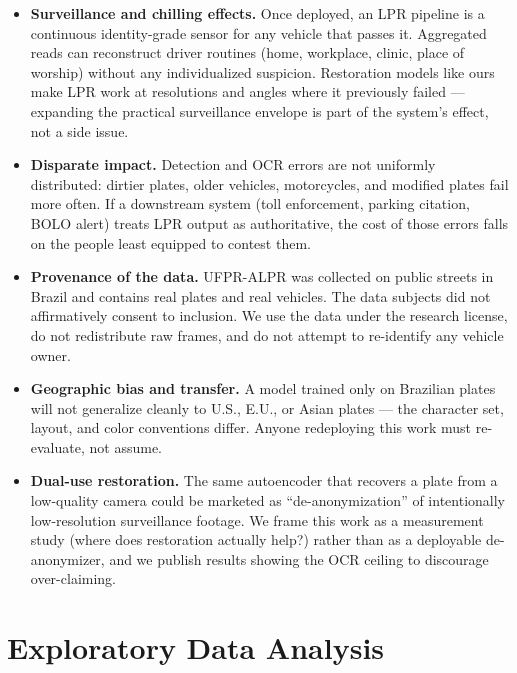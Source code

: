 \documentclass[11pt]{article}
\begin{document}
\begin{itemize}[leftmargin=*]
\item \textbf{Surveillance and chilling effects.} Once deployed, an LPR
  pipeline is a continuous identity-grade sensor for any vehicle that passes
  it. Aggregated reads can reconstruct driver routines (home, workplace,
  clinic, place of worship) without any individualized suspicion. Restoration
  models like ours make LPR work at resolutions and angles where it
  previously failed --- expanding the practical surveillance envelope is part
  of the system's effect, not a side issue.
\item \textbf{Disparate impact.} Detection and OCR errors are not uniformly
  distributed: dirtier plates, older vehicles, motorcycles, and modified
  plates fail more often. If a downstream system (toll enforcement, parking
  citation, BOLO alert) treats LPR output as authoritative, the cost of those
  errors falls on the people least equipped to contest them.
\item \textbf{Provenance of the data.} UFPR-ALPR was collected on public
  streets in Brazil and contains real plates and real vehicles. The data
  subjects did not affirmatively consent to inclusion. We use the data under
  the research license, do not redistribute raw frames, and do not attempt to
  re-identify any vehicle owner.
\item \textbf{Geographic bias and transfer.} A model trained only on
  Brazilian plates will not generalize cleanly to U.S., E.U., or Asian
  plates --- the character set, layout, and color conventions differ. Anyone
  redeploying this work must re-evaluate, not assume.
\item \textbf{Dual-use restoration.} The same autoencoder that recovers a
  plate from a low-quality camera could be marketed as ``de-anonymization''
  of intentionally low-resolution surveillance footage. We frame this work as
  a measurement study (where does restoration actually help?) rather than as
  a deployable de-anonymizer, and we publish results showing the OCR ceiling
  to discourage over-claiming.
\end{itemize}

\section{Exploratory Data Analysis}
\end{document}
